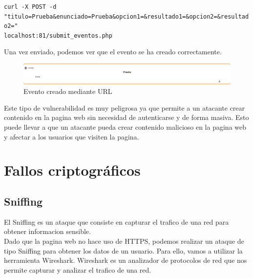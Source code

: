 \documentclass{report}
\begin{document}
                \begin{center}
                    \texttt{curl -X POST -d "titulo=Prueba\&enunciado=Prueba\&opcion1=\&resultado1=\&opcion2=\&resultado2="\\localhost:81/submit\_eventos.php}
                \end{center}

                Una vez enviado, podemos ver que el evento se ha creado correctamente.
                \begin{figure}[H]
                    \centering
                    \includegraphics[width=1\textwidth]{./img/vulnerabilidades/2.1/1.1.png}
                    \caption{Evento creado mediante URL}
                \end{figure}

                Este tipo de vulnerabilidad es muy peligrosa ya que permite a un atacante crear contenido en la pagina web sin necesidad de autenticarse y de forma masiva.
                Esto puede llevar a que un atacante pueda crear contenido malicioso en la pagina web y afectar a los usuarios que visiten la pagina.               
            \clearpage
        \section{Fallos criptográficos}
            \subsection{Sniffing}
                El Sniffing es un ataque que consiste en capturar el trafico de una red para obtener informacion sensible.\\
                Dado que la pagina web no hace uso de HTTPS, podemos realizar un ataque de tipo Sniffing para obtener los datos de un usuario.
                Para ello, vamos a utilizar la herramienta Wireshark.
                Wireshark es un analizador de protocolos de red que nos permite capturar y analizar el trafico de una red.\\
\end{document}
